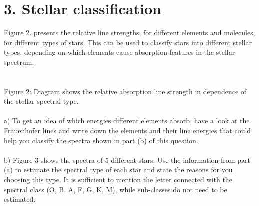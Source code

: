 \section*{3. Stellar classification}

Figure 2. presents the relative line strengths, for different elements and molecules, for different types
of stars. This can be used to classify stars into different stellar types, depending on which elements
cause absorption features in the stellar spectrum.\\
\\

\noindent{}\\

Figure 2: Diagram shows the relative absorption line strength in dependence of the stellar spectral 
type.\\
\\
a) To get an idea of which energies different elements absorb, have a look at the Frauenhofer lines and
write down the elements and their line energies that could help you classify the spectra shown in part
(b) of this question.\\
\\
b) Figure 3 shows the spectra of 5 different stars. Use the information from part (a) to estimate the
spectral type of each star and state the reasons for you choosing this type. It is sufficient to mention
the letter connected with the spectral class (O, B, A, F, G, K, M), while sub-classes do not need to be
estimated.\\
\\

